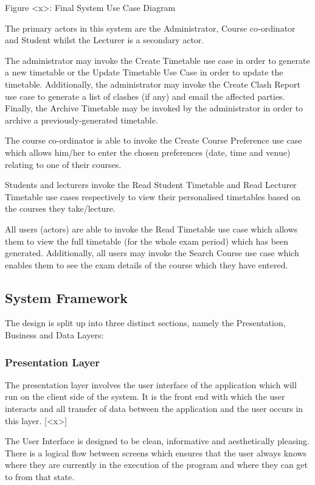 \documentclass{article}
\begin{document}
Figure <x>: Final System Use Case Diagram

The primary actors in this system are the Administrator, Course co-ordinator and Student whilst the Lecturer is a secondary actor. 

The administrator may invoke the Create Timetable use case in order to generate a new timetable or the Update Timetable Use Case in order to update the timetable. Additionally, the administrator may invoke the Create Clash Report use case to generate a list of clashes (if any) and email the affected parties. Finally, the Archive Timetable may be invoked by the administrator in order to archive a previously-generated timetable.

The course co-ordinator is able to invoke the Create Course Preference use case which allows him/her to enter the chosen preferences (date, time and venue) relating to one of their courses.

Students and lecturers invoke the Read Student Timetable and Read Lecturer Timetable use cases respectively to view their personalised timetables based on the courses they take/lecture.

All users (actors) are able to invoke the Read Timetable use case which allows them to view the full timetable (for the whole exam period) which has been generated. Additionally, all users may invoke the Search Course use case which enables them to see the exam details of the course which they have entered.

\subsection{System Framework}
The design is split up into three distinct sections, namely the Presentation, Business and Data Layers: 

\subsubsection{Presentation Layer}
The presentation layer involves the user interface of the application which will run on the client side of the system. It is the front end with which the user
interacts and all transfer of data between the application and the user occurs in this layer. [<x>]

The User Interface is designed to be clean, informative and aesthetically pleasing. There is a logical flow
between screens which ensures that the user always knows where they are currently in the execution of
the program and where they can get to from that state.
\end{document}
